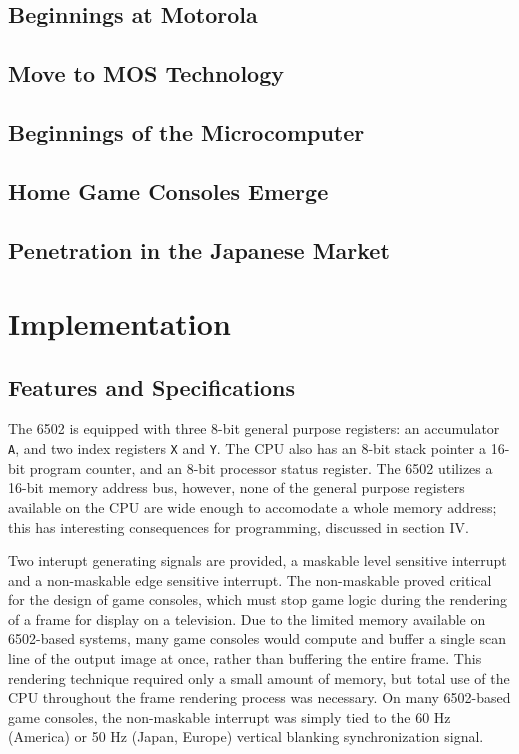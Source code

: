 \documentclass[journal]{IEEEtran}
\begin{document}
\subsection{Beginnings at Motorola}

\subsection{Move to MOS Technology}

\subsection{Beginnings of the Microcomputer}

\subsection{Home Game Consoles Emerge}

\subsection{Penetration in the Japanese Market}

\section{Implementation}

\subsection{Features and Specifications}

The 6502 is equipped with three 8-bit general purpose registers: an accumulator
\texttt{A}, and two index registers \texttt{X} and \texttt{Y}. The CPU also has
an 8-bit stack pointer a 16-bit program counter, and an 8-bit processor status
register. The 6502 utilizes a 16-bit memory address bus, however, none of the
general purpose registers available on the CPU are wide enough to accomodate a
whole memory address; this has interesting consequences for programming,
discussed in section IV.

Two interupt generating signals are provided, a maskable level sensitive
interrupt and a non-maskable edge sensitive interrupt. The non-maskable proved
critical for the design of game consoles, which must stop game logic during the
rendering of a frame for display on a television. Due to the limited memory
available on 6502-based systems, many game consoles would compute and buffer a
single scan line of the output image at once, rather than buffering the entire
frame. This rendering technique required only a small amount of memory, but
total use of the CPU throughout the frame rendering process was necessary. On
many 6502-based game consoles, the non-maskable interrupt was simply tied to the
60 Hz (America) or 50 Hz (Japan, Europe) vertical blanking synchronization
signal.
\end{document}
